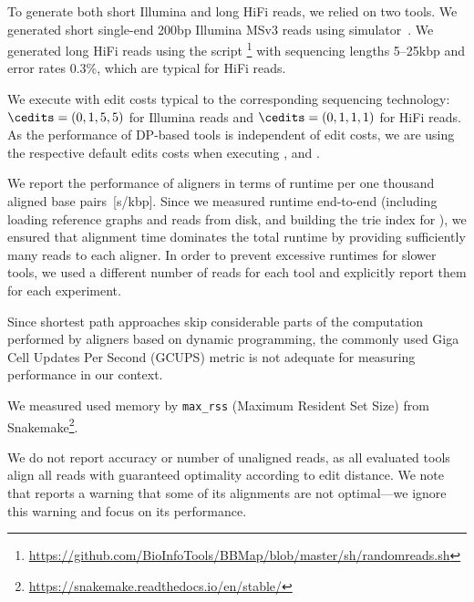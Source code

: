 To generate both short Illumina and long HiFi reads, we relied on two tools. We
generated short single-end 200bp Illumina MSv3 reads using \art
simulator~\citep{huang2011art}. We generated long HiFi reads using the script
\randomreads\footnote{\url{https://github.com/BioInfoTools/BBMap/blob/master/sh/randomreads.sh}}
with sequencing lengths \mbox{5--25kbp} and error rates 0.3\%, which are typical
for HiFi reads.

We execute \astarix with edit costs typical to the corresponding sequencing
technology: $\cedits=(0,1,5,5)$ for Illumina reads and $\cedits=(0,1,1,1)$ for
HiFi reads. As the performance of DP-based tools is independent of edit costs,
we are using the respective default edits costs when executing \graphaligner,
\pasgal and \vargas.


%
We report the performance of aligners in terms of runtime per one thousand
aligned base pairs~[s/kbp]. Since we measured runtime end-to-end (including
loading reference graphs and reads from disk, and building the trie index for
\astarix), we ensured that alignment time dominates the total runtime by
providing sufficiently many reads to each aligner. In order to prevent excessive
runtimes for slower tools, we used a different number of reads for each tool
and explicitly report them for each experiment.

Since shortest path approaches skip considerable parts of the computation
performed by aligners based on dynamic programming, the commonly used Giga Cell
Updates Per Second (GCUPS) metric is not adequate for measuring performance in
our context. 

We measured used memory by \texttt{max\_rss} (Maximum Resident Set Size) from
Snakemake\footnote{\url{https://snakemake.readthedocs.io/en/stable/}}.

We do not report accuracy or number of unaligned reads, as all evaluated
tools align all reads with guaranteed optimality according to edit distance. 
%
We note that \vargas reports a warning that some of its alignments are not
optimal---we ignore this warning and focus on its performance.
